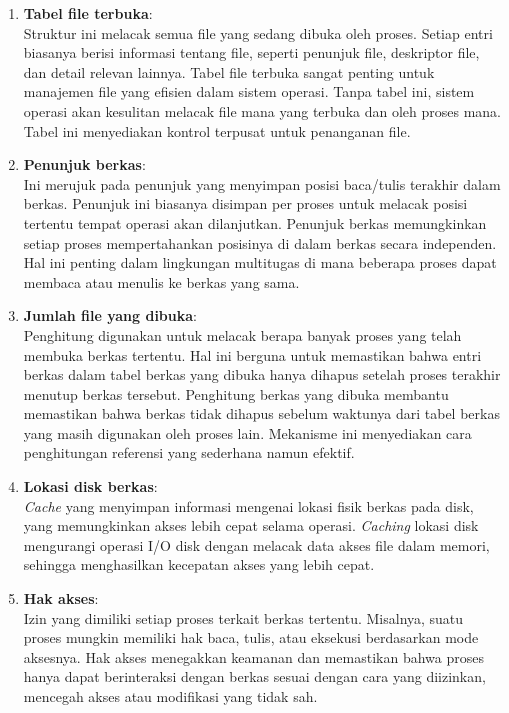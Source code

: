 \documentclass[12pt]{article}
\begin{document}
\begin{enumerate}
    \item \textbf{Tabel file terbuka}: \\
    Struktur ini melacak semua file yang sedang dibuka oleh proses. Setiap entri biasanya berisi informasi tentang file, seperti penunjuk file, deskriptor file, dan detail relevan lainnya. Tabel file terbuka sangat penting untuk manajemen file yang efisien dalam sistem operasi. Tanpa tabel ini, sistem operasi akan kesulitan melacak file mana yang terbuka dan oleh proses mana. Tabel ini menyediakan kontrol terpusat untuk penanganan file.

    \item \textbf{Penunjuk berkas}: \\
    Ini merujuk pada penunjuk yang menyimpan posisi baca/tulis terakhir dalam berkas. Penunjuk ini biasanya disimpan per proses untuk melacak posisi tertentu tempat operasi akan dilanjutkan. Penunjuk berkas memungkinkan setiap proses mempertahankan posisinya di dalam berkas secara independen. Hal ini penting dalam lingkungan multitugas di mana beberapa proses dapat membaca atau menulis ke berkas yang sama.

    \item \textbf{Jumlah file yang dibuka}: \\
    Penghitung digunakan untuk melacak berapa banyak proses yang telah membuka berkas tertentu. Hal ini berguna untuk memastikan bahwa entri berkas dalam tabel berkas yang dibuka hanya dihapus setelah proses terakhir menutup berkas tersebut. Penghitung berkas yang dibuka membantu memastikan bahwa berkas tidak dihapus sebelum waktunya dari tabel berkas yang masih digunakan oleh proses lain. Mekanisme ini menyediakan cara penghitungan referensi yang sederhana namun efektif.

    \item \textbf{Lokasi disk berkas}: \\
    \textit{Cache} yang menyimpan informasi mengenai lokasi fisik berkas pada disk, yang memungkinkan akses lebih cepat selama operasi. \textit{Caching} lokasi disk mengurangi operasi I/O disk dengan melacak data akses file dalam memori, sehingga menghasilkan kecepatan akses yang lebih cepat.

    \item \textbf{Hak akses}: \\
    Izin yang dimiliki setiap proses terkait berkas tertentu. Misalnya, suatu proses mungkin memiliki hak baca, tulis, atau eksekusi berdasarkan mode aksesnya. Hak akses menegakkan keamanan dan memastikan bahwa proses hanya dapat berinteraksi dengan berkas sesuai dengan cara yang diizinkan, mencegah akses atau modifikasi yang tidak sah.

\end{enumerate}
\end{document}
